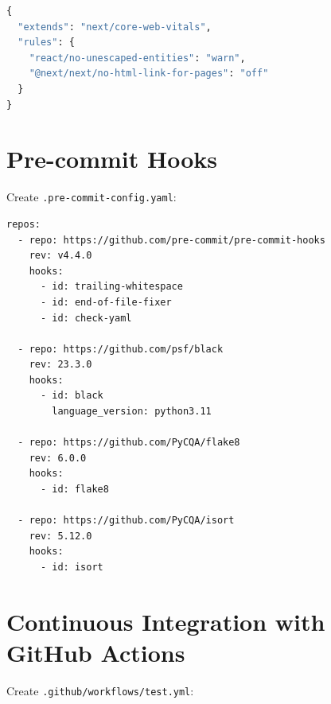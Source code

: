 \documentclass{report}
\begin{document}
\begin{lstlisting}[language=Python, caption=ESLint configuration]
{
  "extends": "next/core-web-vitals",
  "rules": {
    "react/no-unescaped-entities": "warn",
    "@next/next/no-html-link-for-pages": "off"
  }
}
\end{lstlisting}

\section{Pre-commit Hooks}

Create \texttt{.pre-commit-config.yaml}:

\begin{lstlisting}[language=bash, caption=Pre-commit hooks configuration]
repos:
  - repo: https://github.com/pre-commit/pre-commit-hooks
    rev: v4.4.0
    hooks:
      - id: trailing-whitespace
      - id: end-of-file-fixer
      - id: check-yaml

  - repo: https://github.com/psf/black
    rev: 23.3.0
    hooks:
      - id: black
        language_version: python3.11

  - repo: https://github.com/PyCQA/flake8
    rev: 6.0.0
    hooks:
      - id: flake8

  - repo: https://github.com/PyCQA/isort
    rev: 5.12.0
    hooks:
      - id: isort
\end{lstlisting}

\section{Continuous Integration with GitHub Actions}

Create \texttt{.github/workflows/test.yml}:
\end{document}
